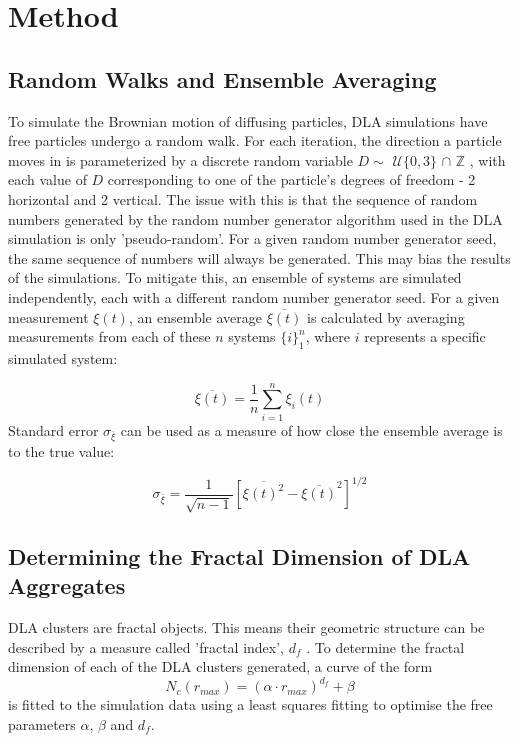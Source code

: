 \documentclass[11pt]{iopart}
\begin{document}
\section{Method}
\subsection{Random Walks and Ensemble Averaging}
To simulate the Brownian motion of diffusing particles, DLA simulations have free particles undergo a random walk. For each iteration, the direction a particle moves in is parameterized by a discrete random variable $D \sim$ $\mathcal{U}\{0, 3\}$ $\cap$ $\mathbb{Z}$ , with each value of $D$ corresponding to one of the particle's degrees of freedom - 2 horizontal and 2 vertical. The issue with this is that the sequence of random numbers generated by the random number generator algorithm used in the DLA simulation is only 'pseudo-random'. For a given random number generator seed, the same sequence of numbers will always be generated. This may bias the results of the simulations. To mitigate this, an ensemble of systems are simulated independently, each with a different random number generator seed. For a given measurement $\xi(t)$, an ensemble average $\overline{\xi(t)}$ is calculated by averaging measurements from each of these $n$ systems $\{i\}_1^n$, where $i$ represents a specific simulated system:


\begin{equation}
\overline{\xi(t)} = \frac{1}{n}\sum_{i=1}^{n}{\xi_i(t)}
\end{equation}
Standard error $\sigma_{\overline{\xi}}$ can be used as a measure of how close the ensemble average is to the true value:

\begin{equation}
\sigma_{\overline{\xi}} = \frac{1}{\sqrt{n-1}} \left[ \overline{\xi(t)^2} - \overline{\xi(t)}^2 \right]^{1/2}
\end{equation}

\subsection{Determining the Fractal Dimension of DLA Aggregates}

DLA clusters are fractal objects. This means their geometric structure can be described by a measure called 'fractal index', $d_f$ \cite{handout}. To determine the fractal dimension of each of the DLA clusters generated, a curve of the form
\begin{equation}
N_c(r_{max}) = (\alpha \cdot r_{max})^{d_f} + \beta
\end{equation}
is fitted to the simulation data using a least squares fitting to optimise the free parameters $\alpha$, $\beta$ and $d_f$. 
\end{document}
